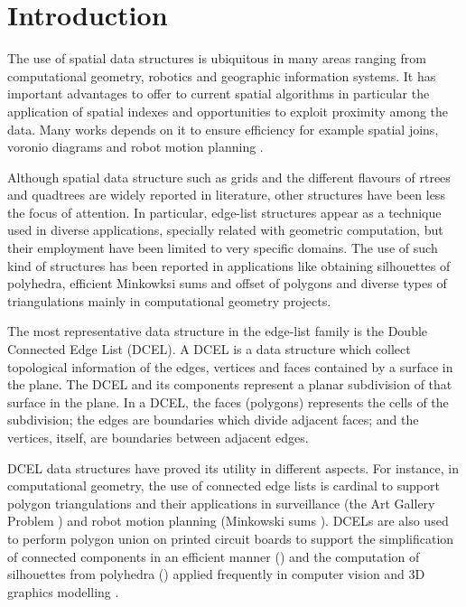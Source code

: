 \section{Introduction}
The use of spatial data structures is ubiquitous in many areas ranging from computational geometry, robotics and geographic information systems.  It has important advantages to offer to current spatial algorithms in particular the application of spatial indexes and opportunities to exploit proximity among the data.  Many works depends on it to ensure efficiency for example spatial joins, voronio diagrams and robot motion planning \cite{berg_computational_2008}.

Although spatial data structure such as grids and the different flavours of rtrees and quadtrees are widely reported in literature, other structures have been less the focus of attention.  In particular, edge-list structures appear as a technique used in diverse applications, specially related with geometric computation, but their employment have been limited to very specific domains.  The use of such kind of structures has been reported in applications like obtaining silhouettes of polyhedra, efficient Minkowksi sums and offset of polygons and diverse types of triangulations mainly in computational geometry projects.

The most representative data structure in the edge-list family is the Double Connected Edge List (DCEL).  A DCEL \cite{muller_finding_1978, preparata_computational_1985} is a data structure which collect topological information of the edges, vertices and faces contained by a surface in the plane.  The DCEL and its components represent a planar subdivision of that surface in the plane. In a DCEL, the faces (polygons) represents the cells of the subdivision; the edges are boundaries which divide adjacent faces; and the vertices, itself, are boundaries between adjacent edges.

DCEL data structures have proved its utility in different aspects.  For instance, in computational geometry, the use of connected edge lists is cardinal to support polygon triangulations and their applications in surveillance (the Art Gallery Problem \cite{chvatal_combinatorial_1975, orourke_art_1987}) and robot motion planning (Minkowski sums \cite{berg_computational_2008, chew_convex_1993}).  DCELs are also used to perform polygon union on printed circuit boards to support the simplification of connected components in an efficient manner (\cite{fogel_cgal_2012}) and the computation of silhouettes from polyhedra (\cite{fogel_cgal_2012, berberich_arrangements_2010}) applied frequently in computer vision and 3D graphics modelling \cite{boguslawski_modelling_2011}.

